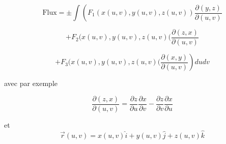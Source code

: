 $$
\text{Flux} = \pm \int \left(F_1( x(u,v),y(u,v),z(u,v) )\frac{\partial(y,z)}{\partial (u,v)} \right.
$$

$$
+F_2( x(u,v),y(u,v),z(u,v)(\frac{\partial(z,x)}{\partial (u,v)}
$$

$$\left.+F_3( x(u,v),y(u,v),z(u,v)(\frac{\partial(x,y)}{\partial (u,v)}\right) dudv
$$

avec par exemple

\[\frac{\partial(z,x)}{\partial (u,v)}=\frac{\partial z}{\partial u}\frac{\partial x}{\partial v}-\frac{\partial z}{\partial v}\frac{\partial x}{\partial u}\]

et \[\vec r (u,v) = x(u,v)\hat i +y(u,v)\hat j +z(u,v)\hat k \]
